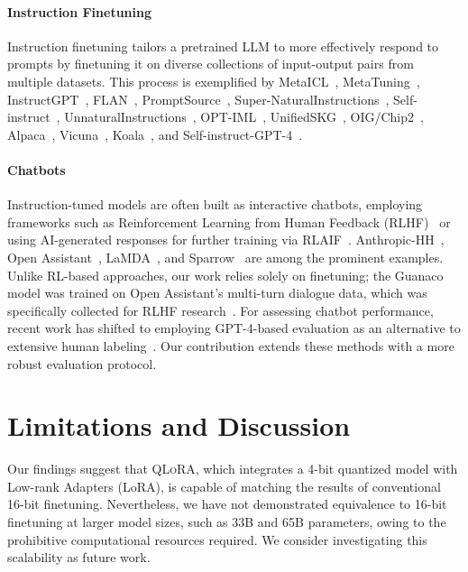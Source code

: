 \paragraph{Instruction Finetuning} Instruction finetuning tailors a pretrained LLM to more effectively respond to prompts by finetuning it on diverse collections of input-output pairs from multiple datasets. This process is exemplified by MetaICL~\citep{min2021metaicl}, MetaTuning~\citep{zhong2021adapting}, InstructGPT~\citep{ouyang2022training}, FLAN~\citep{wei2021finetuned,chung2022scaling}, PromptSource~\citep{bach2022promptsource}, Super-NaturalInstructions~\citep{wang2022super,sanh2021multitask}, Self-instruct~\citep{wang2022self}, UnnaturalInstructions~\citep{honovich2022unnatural}, OPT-IML~\citep{iyer2022opt}, UnifiedSKG~\citep{xie2022unifiedskg}, OIG/Chip2~\citep{laion2023}, Alpaca~\citep{alpaca}, Vicuna~\citep{vicuna2023}, Koala~\citep{koala_blogpost_2023}, and Self-instruct-GPT-4~\citep{peng2023instruction}.

\paragraph{Chatbots} Instruction-tuned models are often built as interactive chatbots, employing frameworks such as Reinforcement Learning from Human Feedback (RLHF)~\citep{christiano2017deep} or using AI-generated responses for further training via RLAIF~\citep{bai2022constitutional}. Anthropic-HH~\citep{askell2021general,bai2022training}, Open Assistant~\citep{kopf2023openassistant}, LaMDA~\citep{thoppilan2022lamda}, and Sparrow~\citep{glaese2022improving} are among the prominent examples. Unlike RL-based approaches, our work relies solely on finetuning; the Guanaco model was trained on Open Assistant’s multi-turn dialogue data, which was specifically collected for RLHF research~\citep{kopf2023openassistant}. For assessing chatbot performance, recent work has shifted to employing GPT-4-based evaluation as an alternative to extensive human labeling~\citep{vicuna2023,peng2023instruction}. Our contribution extends these methods with a more robust evaluation protocol.

\section{Limitations and Discussion}

Our findings suggest that \textsc{QLoRA}, which integrates a 4-bit quantized model with Low-rank Adapters (LoRA), is capable of matching the results of conventional 16-bit finetuning. Nevertheless, we have not demonstrated equivalence to 16-bit finetuning at larger model sizes, such as 33B and 65B parameters, owing to the prohibitive computational resources required. We consider investigating this scalability as future work.

